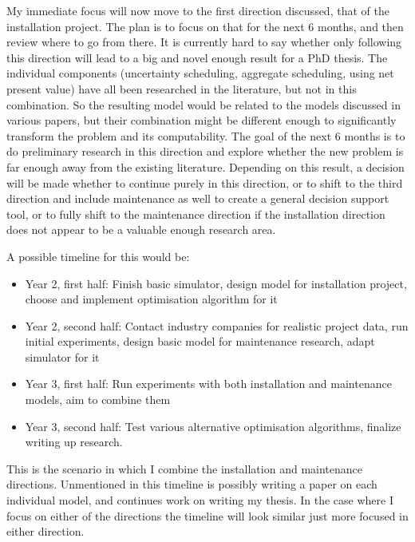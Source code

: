 \documentclass[a4paper,12pt]{article}
\begin{document}
My immediate focus will now move to the first direction discussed, that of the installation project. The plan is to focus on that for the next 6 months, and then review where to go from there. It is currently hard to say whether only following this direction will lead to a big and novel enough result for a PhD thesis. The individual components (uncertainty scheduling, aggregate scheduling, using net present value) have all been researched in the literature, but not in this combination. So the resulting model would be related to the models discussed in various papers, but their combination might be different enough to significantly transform the problem and its computability. The goal of the next 6 months is to do preliminary research in this direction and explore whether the new problem is far enough away from the existing literature. Depending on this result, a decision will be made whether to continue purely in this direction, or to shift to the third direction and include maintenance as well to create a general decision support tool, or to fully shift to the maintenance direction if the installation direction does not appear to be a valuable enough research area. 

A possible timeline for this would be:	

\begin{itemize}
	\item Year 2, first half: Finish basic simulator, design model for installation project, choose and implement optimisation algorithm for it
	\item Year 2, second half:  Contact industry companies for realistic project data, run initial experiments, design basic model for maintenance research, adapt simulator for it
	\item Year 3, first half: Run experiments with both installation and maintenance models, aim to combine them
	\item Year 3, second half: Test various alternative optimisation algorithms, finalize writing up research. 
\end{itemize}

This is the scenario in which I combine the installation and maintenance directions. Unmentioned in this timeline is possibly writing a paper on each individual model, and continues work on writing my thesis. In the case where I focus on either of the directions the timeline will look similar just more focused in either direction. 

\pagebreak




\end{document}

